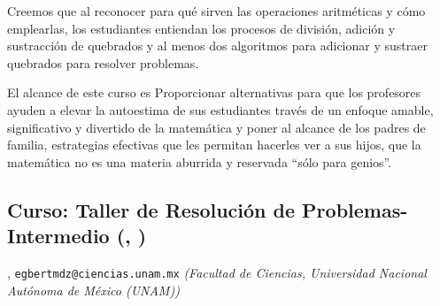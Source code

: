 Creemos que al reconocer para qué sirven las operaciones aritméticas y cómo emplearlas,  los estudiantes entiendan los procesos de división, adición y sustracción de quebrados y al menos dos algoritmos para adicionar y sustraer quebrados para resolver problemas.

El alcance de este curso es Proporcionar alternativas para que los profesores ayuden a elevar la autoestima de sus estudiantes través de un enfoque amable, significativo y divertido de la matemática y poner al alcance de los padres de familia, estrategias efectivas que les permitan hacerles ver a sus hijos, que la matemática no es una materia aburrida y reservada “sólo para genios”. 
\subsection{\sffamily Curso: Taller de Resolución de Problemas-Intermedio {\footnotesize (, )}} \label{reg-1428} 
, {\tt egbertmdz@ciencias.unam.mx}  {\slshape (Facultad de Ciencias, Universidad Nacional Autónoma de México (UNAM))}\\
